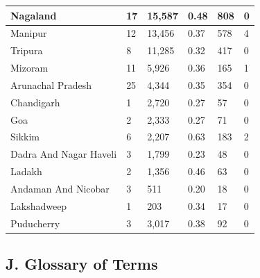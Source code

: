 \documentclass[11pt, a4paper]{article}
\begin{document}
\begin{table}[H]
{\begin{tabularx}{\textwidth}{|Y|Y|Y|Y|Y|Y|}
Nagaland & 17 & 15,587 & 0.48 & 808 & 0 \\ \hline
Manipur & 12 & 13,456 & 0.37 & 578 & 4 \\ \hline
Tripura & 8 & 11,285 & 0.32 & 417 & 0 \\ \hline
Mizoram & 11 & 5,926 & 0.36 & 165 & 1 \\ \hline
Arunachal Pradesh & 25 & 4,344 & 0.35 & 354 & 0 \\ \hline
Chandigarh & 1 & 2,720 & 0.27 & 57 & 0 \\ \hline
Goa & 2 & 2,333 & 0.27 & 71 & 0 \\ \hline
Sikkim & 6 & 2,207 & 0.63 & 183 & 2 \\ \hline
Dadra And Nagar Haveli & 3 & 1,799 & 0.23 & 48 & 0 \\ \hline
Ladakh & 2 & 1,356 & 0.46 & 63 & 0 \\ \hline
Andaman And Nicobar & 3 & 511 & 0.20 & 18 & 0 \\ \hline
Lakshadweep & 1 & 203 & 0.34 & 17 & 0 \\ \hline
Puducherry & 3 & 3,017 & 0.38 & 92 & 0 \\ \hline
\end{tabularx}
}
\end{table}
\vspace{1em}

\subsection{J. Glossary of Terms}
\end{document}
